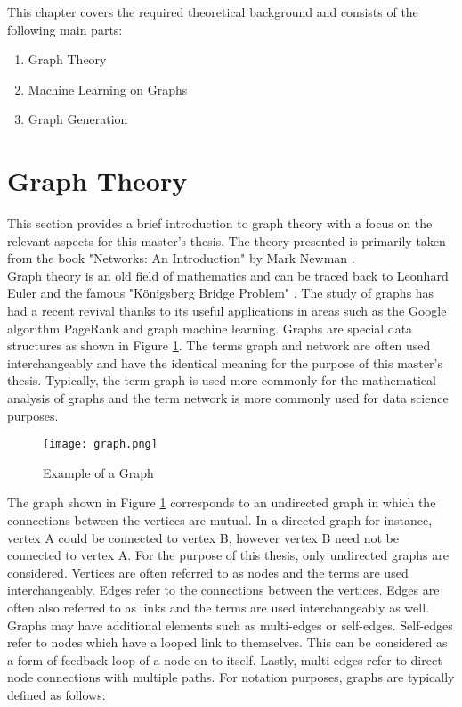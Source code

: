 
	This chapter covers the required theoretical background and consists 
	of the following main parts:

	\begin{enumerate}
		\item Graph Theory
		\item Machine Learning on Graphs
		\item Graph Generation
    \end{enumerate}

	\section{Graph Theory}

	This section provides a brief introduction to graph theory with a focus on
	the relevant aspects for this master's thesis. The theory presented is
	primarily taken from the book "Networks: An Introduction" by Mark Newman
	\citeyearpar{Newman2010}. \\

	\noindent Graph theory is an old field of mathematics and can be traced back 
	to Leonhard Euler and the famous "Königsberg Bridge Problem"
	\citep{euler1741solutio}. The study of graphs has had a recent revival
	thanks to its useful applications in areas such as the Google algorithm
	PageRank \citep{page1999pagerank} and graph machine learning. Graphs are 
	special data structures as shown in Figure \ref{fig:graph}. The terms graph 
	and network are often used interchangeably and have the identical meaning 
	for the purpose of this master's thesis. Typically, the term graph is used 
	more commonly for the mathematical analysis of graphs and the term network 
	is more commonly used for data science purposes. \\

	\begin{figure}[h]
		\centering
		\texttt{[image: graph.png]}
		\caption{Example of a Graph}
		\cite[p. 111]{Newman2010}
		\label{fig:graph}
	\end{figure}
	
	\noindent The graph shown in Figure \ref{fig:graph} corresponds to an 
	undirected graph in which the connections between the vertices are mutual. 
	In a directed graph for instance, vertex A could be connected to vertex B, 
	however vertex B need not be connected to vertex A. For the purpose of this 
	thesis, only undirected graphs are considered. Vertices are often referred 
	to as nodes and the terms are used interchangeably. Edges refer to the
	connections between the vertices. Edges are often also referred to as links
	and the terms are used interchangeably as well. Graphs may have additional 
	elements such as multi-edges or self-edges. Self-edges refer to
	nodes which have a looped link to themselves. This can be considered as a
	form of feedback loop of a node on to itself. Lastly, multi-edges refer to 
	direct node connections with multiple paths. For notation purposes, graphs 
	are typically defined as follows:


